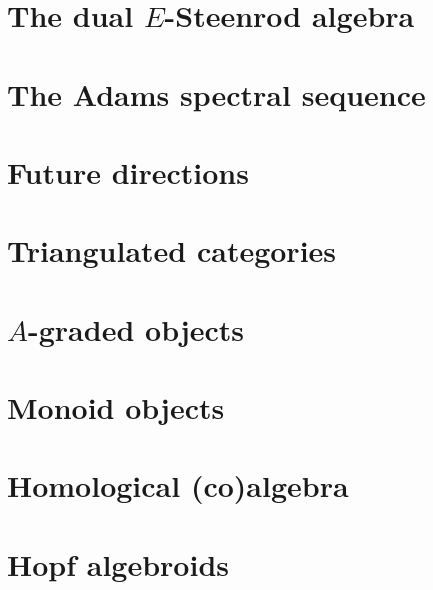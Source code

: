 \documentclass[openany, amssymb]{amsart}
\theoremstyle{plain}
\theoremstyle{definition}
\newcommand{\0}{\mathbf{0}}
\renewcommand{\(}{\left(}
\renewcommand{\)}{\right)}
\renewcommand{\1}{\mbf{1}}
\begin{document}


\section{The dual \texorpdfstring{$E$}{E}-Steenrod algebra}\label{section:dual_E-Steenrod_algebra}\label{section{dual_E-Steenrod}}



\section{The Adams spectral sequence}\label{section:ASS}



\section{Future directions}\label{section:future}



\appendix

\section{Triangulated categories}\label{appendix:triangulated}



\section{\texorpdfstring{$A$}{A}-graded objects}\label{appendix:graded_stuff}



\section{Monoid objects}\label{appendix:monoid_objects}



\section{Homological (co)algebra}\label{appendix:coalgebra}



\section{Hopf algebroids}\label{appendix:hopf_algebroids}



\printbibliography
\end{document}
